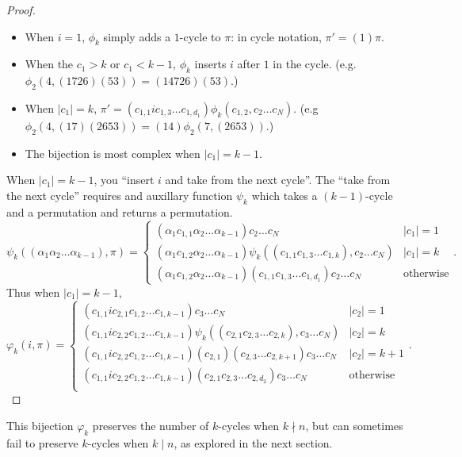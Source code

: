 \documentclass{article}
\numberwithin{equation}{subsection}
\begin{document}
\begin{proof}
  \begin{itemize}
    \item When $i = 1$, $\phi_k$ simply adds a
    $1$-cycle to $\pi$: in cycle notation, $\pi' = (1)\pi$.
    \item When the $c_1 > k$ or $c_1 < k -1$, $\phi_k$ inserts $i$ after $1$
    in the cycle.
    (e.g. $\phi_2(4,(1726)(53))= (14726)(53)$.)
    \item When $|c_1| = k$, $\pi' = (c_{1,1}ic_{1,3}\dots c_{1,d_1})\phi_k(c_{1,2},c_2\dots c_N)$.
    (e.g $\phi_2(4,(17)(2653)) = (14) \phi_2(7, (2653))$.)
    \item The bijection is most complex when $|c_1| = k - 1$.
  \end{itemize}
  When $|c_1| = k - 1$, you ``insert $i$ and take from the next cycle''. The
  ``take from the next cycle'' requires and auxillary function $\psi_k$ which
  takes a $(k-1)$-cycle and a permutation and returns a permutation. \begin{equation}
    \psi_k((\alpha_1 \alpha_2 \dots \alpha_{k-1}), \pi) = \begin{cases}
      (\alpha_1 c_{1,1} \alpha_2 \dots \alpha_{k-1})c_2 \dots c_N & |c_1| = 1 \\
      (\alpha_1 c_{1,2} \alpha_2 \dots \alpha_{k-1})\psi_k((c_{1,1}c_{1,3} \dots c_{1,k}), c_2 \dots c_N) & |c_1| = k \\
      (\alpha_1 c_{1,2} \alpha_2 \dots \alpha_{k-1})(c_{1,1}c_{1,3}\dots c_{1,d_1})c_2 \dots c_N & \text{otherwise}
    \end{cases}.
  \end{equation}
  Thus when $|c_1| = k-1$, \begin{equation}
    \varphi_k(i, \pi) = \begin{cases}
      (c_{1,1} i c_{2,1} c_{1,2} \dots c_{1,k-1}) c_3 \dots c_N & |c_2| = 1 \\
      (c_{1,1} i c_{2,2} c_{1,2} \dots c_{1,k-1})\psi_k((c_{2,1} c_{2,3}\dots c_{2,k}), c_3 \dots c_N) & |c_2| = k \\
      (c_{1,1} i c_{2,2} c_{1,2} \dots c_{1,k-1})(c_{2,1})(c_{2,3}\dots c_{2,k+1}) c_3 \dots c_N & |c_2| = k+1 \\
      (c_{1,1} i c_{2,2} c_{1,2} \dots c_{1,k-1})(c_{2,1} c_{2,3}\dots c_{2,d_2}) c_3 \dots c_N & \text{otherwise} \\
    \end{cases}.
  \end{equation}
\end{proof}
This bijection $\varphi_k$ preserves the number of $k$-cycles when
$k \nmid n$, but can sometimes fail to preserve $k$-cycles when $k \mid n$,
as explored in the next section.
\end{document}
